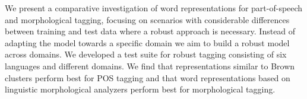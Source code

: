 We present a comparative investigation of word representations for part-of-speech and morphological tagging, focusing on scenarios with considerable differences between training and test data where a robust approach is necessary. Instead of adapting the model towards a specific domain we aim to build a robust model across domains. We developed a test suite for robust tagging consisting of six languages and different domains. We find that representations similar to Brown clusters perform best for POS tagging and that word representations based on linguistic morphological analyzers perform best for morphological tagging.
